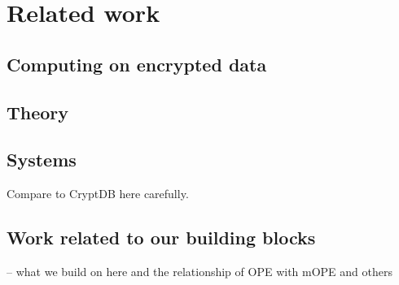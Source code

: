
\section{Related work}\label{sec:related}

\subsection{Computing on encrypted data}

\subsection{Theory}


\subsection{Systems}

Compare to CryptDB here carefully. 

\subsection{Work related to our building blocks}

-- what we build on here and the relationship of OPE with mOPE and others